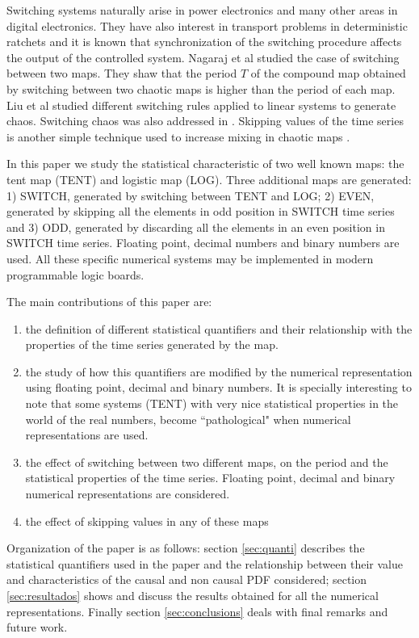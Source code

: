 Switching systems naturally arise in power electronics and many other areas in digital electronics. They have also interest in transport problems in deterministic ratchets \cite{Zarlenga2009} and it is known that synchronization of the switching procedure affects the output of the controlled system. Nagaraj et al \cite{Nagaraj2008} studied the case of switching between two maps. They shaw that the period $T$ of the
compound map obtained by switching between two chaotic maps is
higher than the period of each map.  Liu et al \cite{Liu2006} studied different switching rules applied to linear systems to generate chaos. Switching chaos was also addressed in \cite{Gluskin2008}.  Skipping values of the time series is another simple technique used to increase mixing in chaotic maps \cite{DeMicco2008}. 

In this paper we study the statistical characteristic of two well known maps: the tent map (TENT) and logistic map (LOG). Three additional maps are generated: 1) SWITCH, generated by switching between TENT and LOG; 2) EVEN, generated by skipping all the elements in odd position in SWITCH time series and 3) ODD, generated by discarding all the elements in an even position in SWITCH time series. Floating point, decimal numbers and binary numbers are used. All these specific numerical systems may be implemented in modern programmable logic boards. 

The main contributions of this paper are:
\begin{enumerate}
\item the definition of different statistical quantifiers and their relationship  with the properties of the time series generated by the map. 
\item the study of how this quantifiers are modified by the numerical representation using floating point, decimal and binary numbers. It is specially interesting to note that some systems (TENT) with very nice statistical properties in the world of the real numbers, become ``pathological" when numerical representations are used.
\item the effect of switching between two different maps, on the period and the statistical properties of the time series. Floating point, decimal and binary numerical representations are considered. 
\item the effect of skipping values in any of these maps
\end{enumerate}

Organization of the paper is as follows: section \ref{sec:quanti} describes the statistical quantifiers used in the paper and the relationship between their value and characteristics of the causal and non causal PDF considered; section \ref{sec:resultados} shows and discuss the results obtained for all the numerical representations. Finally section  \ref{sec:conclusions} deals with final remarks and future work. 
%
